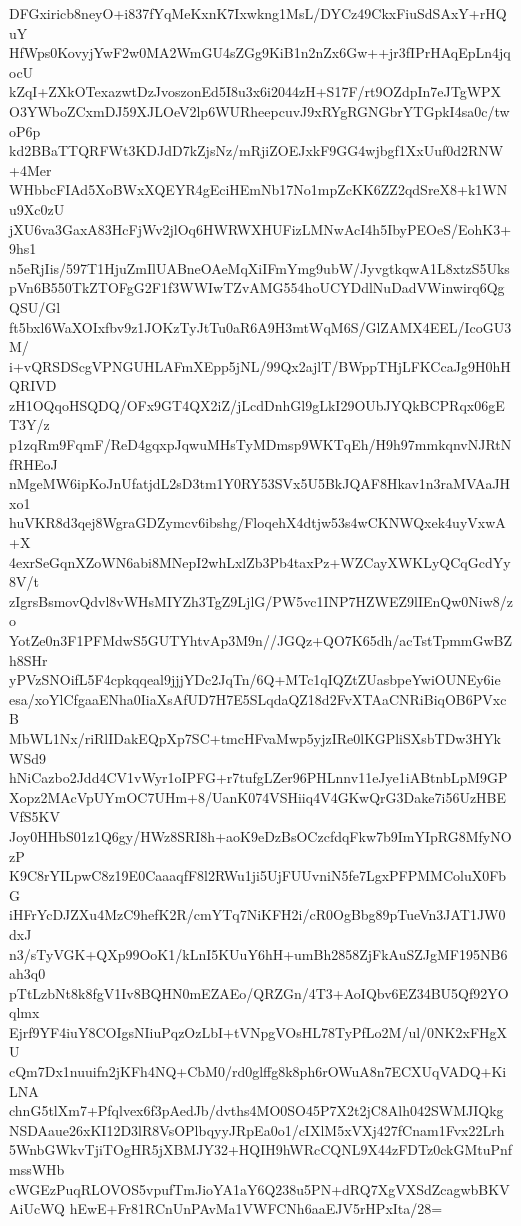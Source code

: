 DFGxiricb8neyO+i837fYqMeKxnK7Ixwkng1MsL/DYCz49CkxFiuSdSAxY+rHQuY
HfWps0KovyjYwF2w0MA2WmGU4sZGg9KiB1n2nZx6Gw++jr3fIPrHAqEpLn4jqocU
kZqI+ZXkOTexazwtDzJvoszonEd5I8u3x6i2044zH+S17F/rt9OZdpIn7eJTgWPX
O3YWboZCxmDJ59XJLOeV2lp6WURheepcuvJ9xRYgRGNGbrYTGpkI4sa0c/twoP6p
kd2BBaTTQRFWt3KDJdD7kZjsNz/mRjiZOEJxkF9GG4wjbgf1XxUuf0d2RNW+4Mer
WHbbcFIAd5XoBWxXQEYR4gEciHEmNb17No1mpZcKK6ZZ2qdSreX8+k1WNu9Xc0zU
jXU6va3GaxA83HcFjWv2jlOq6HWRWXHUFizLMNwAcI4h5IbyPEOeS/EohK3+9hs1
n5eRjIis/597T1HjuZmIlUABneOAeMqXiIFmYmg9ubW/JyvgtkqwA1L8xtzS5Uks
pVn6B550TkZTOFgG2F1f3WWIwTZvAMG554hoUCYDdlNuDadVWinwirq6QgQSU/Gl
ft5bxl6WaXOIxfbv9z1JOKzTyJtTu0aR6A9H3mtWqM6S/GlZAMX4EEL/IcoGU3M/
i+vQRSDScgVPNGUHLAFmXEpp5jNL/99Qx2ajlT/BWppTHjLFKCcaJg9H0hHQRIVD
zH1OQqoHSQDQ/OFx9GT4QX2iZ/jLcdDnhGl9gLkI29OUbJYQkBCPRqx06gET3Y/z
p1zqRm9FqmF/ReD4gqxpJqwuMHsTyMDmsp9WKTqEh/H9h97mmkqnvNJRtNfRHEoJ
nMgeMW6ipKoJnUfatjdL2sD3tm1Y0RY53SVx5U5BkJQAF8Hkav1n3raMVAaJHxo1
huVKR8d3qej8WgraGDZymcv6ibshg/FloqehX4dtjw53s4wCKNWQxek4uyVxwA+X
4exrSeGqnXZoWN6abi8MNepI2whLxlZb3Pb4taxPz+WZCayXWKLyQCqGcdYy8V/t
zIgrsBsmovQdvl8vWHsMIYZh3TgZ9LjlG/PW5vc1INP7HZWEZ9lIEnQw0Niw8/zo
YotZe0n3F1PFMdwS5GUTYhtvAp3M9n//JGQz+QO7K65dh/acTstTpmmGwBZh8SHr
yPVzSNOifL5F4cpkqqeal9jjjYDc2JqTn/6Q+MTc1qIQZtZUasbpeYwiOUNEy6ie
esa/xoYlCfgaaENha0IiaXsAfUD7H7E5SLqdaQZ18d2FvXTAaCNRiBiqOB6PVxcB
MbWL1Nx/riRlIDakEQpXp7SC+tmcHFvaMwp5yjzIRe0lKGPliSXsbTDw3HYkWSd9
hNiCazbo2Jdd4CV1vWyr1oIPFG+r7tufgLZer96PHLnnv11eJye1iABtnbLpM9GP
Xopz2MAcVpUYmOC7UHm+8/UanK074VSHiiq4V4GKwQrG3Dake7i56UzHBEVfS5KV
Joy0HHbS01z1Q6gy/HWz8SRI8h+aoK9eDzBsOCzcfdqFkw7b9ImYIpRG8MfyNOzP
K9C8rYILpwC8z19E0CaaaqfF8l2RWu1ji5UjFUUvniN5fe7LgxPFPMMColuX0FbG
iHFrYcDJZXu4MzC9hefK2R/cmYTq7NiKFH2i/cR0OgBbg89pTueVn3JAT1JW0dxJ
n3/sTyVGK+QXp99OoK1/kLnI5KUuY6hH+umBh2858ZjFkAuSZJgMF195NB6ah3q0
pTtLzbNt8k8fgV1Iv8BQHN0mEZAEo/QRZGn/4T3+AoIQbv6EZ34BU5Qf92YOqlmx
Ejrf9YF4iuY8COIgsNIiuPqzOzLbI+tVNpgVOsHL78TyPfLo2M/ul/0NK2xFHgXU
cQm7Dx1nuuifn2jKFh4NQ+CbM0/rd0glffg8k8ph6rOWuA8n7ECXUqVADQ+KiLNA
chnG5tlXm7+Pfqlvex6f3pAedJb/dvths4MO0SO45P7X2t2jC8Alh042SWMJIQkg
NSDAaue26xKI12D3lR8VsOPlbqyyJRpEa0o1/cIXlM5xVXj427fCnam1Fvx22Lrh
5WnbGWkvTjiTOgHR5jXBMJY32+HQIH9hWRcCQNL9X44zFDTz0ckGMtuPnfmssWHb
cWGEzPuqRLOVOS5vpufTmJioYA1aY6Q238u5PN+dRQ7XgVXSdZcagwbBKVAiUcWQ
hEwE+Fr81RCnUnPAvMa1VWFCNh6aaEJV5rHPxIta/28=
